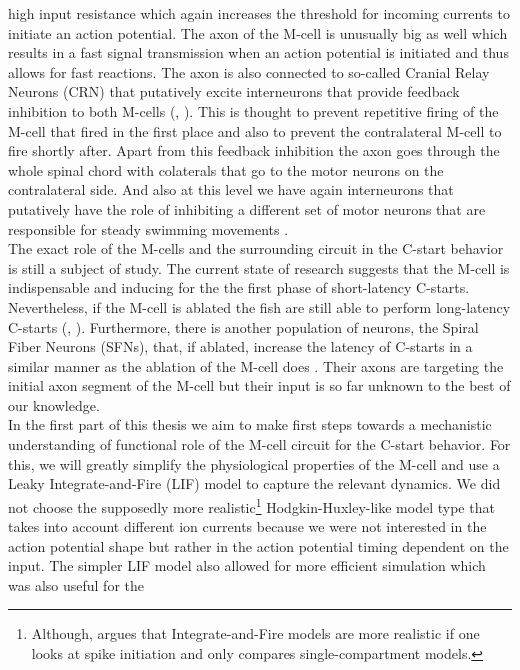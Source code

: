 	high input resistance which again increases the threshold for incoming currents to initiate an 
	action potential.
	The axon of the M-cell is unusually big as well which results in a fast signal transmission 
	when an action potential is initiated and thus allows for fast reactions.
	The axon is also connected to so-called Cranial Relay Neurons (CRN) that putatively excite interneurons that provide feedback inhibition to both M-cells (\cite{Koyama2011}, \cite{Hale2016}).
	This is thought to prevent repetitive firing of the M-cell that fired in the first place and 
	also to prevent the contralateral M-cell to fire shortly after.
	Apart from this feedback inhibition the axon goes through the whole spinal chord with 
	colaterals that go to the motor neurons on the contralateral side.
	And also at this level we have again interneurons that putatively have the role of inhibiting a 
	different set of motor neurons that are responsible for steady swimming movements 
	\citep{Song2015}.\\
	The exact role of the M-cells and the surrounding circuit in the C-start behavior is still a 
	subject of study.
	The current state of research suggests that the M-cell is indispensable and inducing for the 
	the first phase of short-latency C-starts.
	Nevertheless, if the M-cell is ablated the fish are still able to perform long-latency C-starts 
	(\cite{Lacoste2015}, \cite{Dunn2016}).
	Furthermore, there is another population of neurons, the Spiral Fiber Neurons (SFNs), that, if ablated, increase the latency of C-starts in a similar manner as the ablation of the M-cell does \citep{Lacoste2015}.
    Their axons are targeting the initial axon segment of the M-cell but their input is so far unknown to the best of our knowledge.\\
	In the first part of this thesis we aim to make first steps towards a mechanistic understanding 
	of functional role of the M-cell circuit for the C-start behavior.
	For this, we will greatly simplify the physiological properties of the M-cell and use a Leaky 
	Integrate-and-Fire (LIF) model to capture the relevant dynamics.
	We did not choose the supposedly more realistic\footnote{Although, \cite{Brette2015} argues that Integrate-and-Fire models are more realistic if one looks at spike initiation and only compares single-compartment models.}  Hodgkin-Huxley-like model type that takes into account different ion currents because we were not interested in the action potential shape but rather in the action potential timing dependent on the input.
	The simpler LIF model also allowed for more efficient simulation which was also useful for the 
